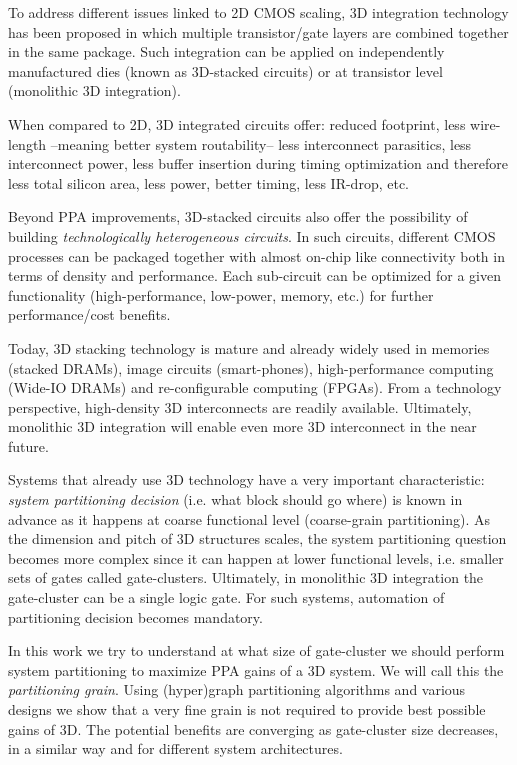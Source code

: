 \documentclass[conference]{IEEEtran}
\begin{document}
To address different issues linked to 2D CMOS scaling, 3D integration technology has been proposed in which multiple transistor/gate layers are combined together in the same package. Such integration can be applied on independently manufactured dies (known as 3D-stacked circuits) or at transistor level (monolithic 3D integration). 

When compared to 2D, 3D integrated circuits offer: reduced footprint, less wire-length --meaning better system routability-- less interconnect parasitics, less interconnect power, less buffer insertion during timing optimization and therefore less total silicon area, less power, better timing, less IR-drop, etc. 

Beyond PPA improvements, 3D-stacked circuits also offer the possibility of building  \emph{technologically heterogeneous circuits}. In such circuits, different CMOS processes can be packaged together with almost on-chip like connectivity both in terms of density and performance. Each sub-circuit can be optimized for a given functionality (high-performance, low-power, memory, etc.) for further performance/cost benefits.

Today, 3D stacking technology is mature and already widely used in memories (stacked DRAMs), image circuits (smart-phones), high-performance computing (Wide-IO DRAMs) and re-configurable computing (FPGAs). From a technology perspective, high-density 3D interconnects are readily available. Ultimately, monolithic 3D integration will enable even more 3D interconnect in the near future.

Systems that already use 3D technology have a very important characteristic: \textit{system partitioning decision} (i.e. what block should go where) is known in advance as it happens at coarse functional level (coarse-grain partitioning). As the dimension and pitch of 3D structures scales, the system partitioning question becomes more complex since it can happen at lower functional levels, i.e. smaller sets of gates called gate-clusters. Ultimately, in monolithic 3D integration the gate-cluster can be a single logic gate. For such systems, automation of partitioning decision becomes mandatory. 

In this work we try to understand at what size of gate-cluster we should perform system partitioning to maximize PPA gains of a 3D system. We will call this the \textit{partitioning grain}. Using (hyper)graph partitioning algorithms and various designs we show that a very fine grain is not required to provide best possible gains of 3D. The potential benefits are converging as gate-cluster size decreases, in a similar way and for different system architectures.
\end{document}
